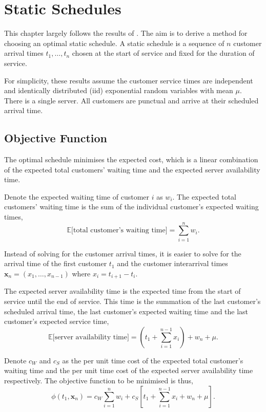 \chapter{Static Schedules}
\label{chap:Static}
This chapter largely follows the results of \citet{Pegden}. The aim is to derive a method for choosing an optimal static schedule. A static schedule is a sequence of $n$ customer arrival times $t_{1}, \ldots, t_{n}$ chosen at the start of service and fixed for the duration of service. 

For simplicity, these results assume the customer service times are independent and identically distributed (iid) exponential random variables with mean $\mu$. There is a single server. All customers are punctual and arrive at their scheduled arrival time.

\section{Objective Function}
The optimal schedule minimises the expected cost, which is a linear combination of the expected total customers' waiting time and the expected server availability time.

Denote the expected waiting time of customer $i$ as $w_{i}$. The expected total customers' waiting time is the sum of the individual customer's expected waiting times,
\begin{equation}
	\mathbb{E} \Big[\text{total customer's waiting time} \Big] = \sum_{i = 1}^{n} w_{i}.
\end{equation}

Instead of solving for the customer arrival times, it is easier to solve for the arrival time of the first customer $t_{1}$ and the customer interarrival times $\mathbf{x}_{n} = (x_{1}, \ldots, x_{n - 1})$ where $x_{i} = t_{i + 1} - t_{i}$.

The expected server availability time is the expected time from the start of service until the end of service. This time is the summation of the last customer's scheduled arrival time, the last customer's expected waiting time and the last customer's expected service time,
\begin{equation}
	\mathbb{E} \Big[\text{server availability time} \Big] = \left( t_{1} + \sum_{i = 1}^{n - 1} x_{i} \right) + w_{n} + \mu.
\end{equation}

Denote $c_{W}$ and $c_{S}$ as the per unit time cost of the expected total customer's waiting time and the per unit time cost of the expected server availability time respectively. The objective function to be minimised is thus,
\begin{equation}
	\phi (t_{1}, \mathbf{x}_{n}) = c_{W} \sum_{i = 1}^{n} w_{i} + c_{S} \left[ t_{1} + \sum_{i = 1}^{n - 1} x_{i} + w_{n} + \mu \right].
\end{equation}

